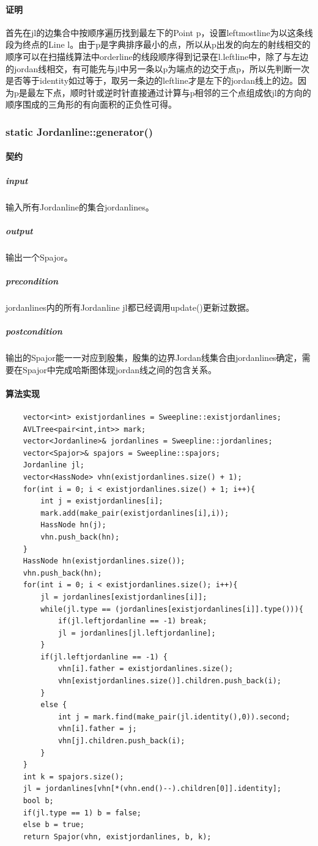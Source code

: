 \documentclass[a4paper]{book}
\numberwithin{equation}{chapter}
\theoremstyle{definition}
\begin{document}
\paragraph{证明}
首先在jl的边集合中按顺序遍历找到最左下的Point p，设置leftmostline为以这条线段为终点的Line l。由于p是字典排序最小的点，所以从p出发的向左的射线相交的顺序可以在扫描线算法中orderline的线段顺序得到记录在l.leftline中，除了与左边的jordan线相交，有可能先与jl中另一条以p为端点的边交于点p，所以先判断一次是否等于identity如过等于，取另一条边的leftline才是左下的jordan线上的边。因为p是最左下点，顺时针或逆时针直接通过计算与p相邻的三个点组成依jl的方向的顺序围成的三角形的有向面积的正负性可得。
\subsubsection{static Jordanline::generator()}
\paragraph{契约}
\subparagraph{input}
输入所有Jordanline的集合jordanlines。
\subparagraph{output}
输出一个Spajor。
\subparagraph{precondition}
jordanlines内的所有Jordanline jl都已经调用update()更新过数据。
\subparagraph{postcondition}
输出的Spajor能一一对应到殷集，殷集的边界Jordan线集合由jordanlines确定，需要在Spajor中完成哈斯图体现jordan线之间的包含关系。
\paragraph{算法实现}
\begin{lstlisting}
	vector<int> existjordanlines = Sweepline::existjordanlines;
	AVLTree<pair<int,int>> mark;
	vector<Jordanline>& jordanlines = Sweepline::jordanlines; 
	vector<Spajor>& spajors = Sweepline::spajors;
	Jordanline jl;
	vector<HassNode> vhn(existjordanlines.size() + 1);
	for(int i = 0; i < existjordanlines.size() + 1; i++){
		int j = existjordanlines[i];
		mark.add(make_pair(existjordanlines[i],i));
		HassNode hn(j);
		vhn.push_back(hn);
	}
	HassNode hn(existjordanlines.size());
	vhn.push_back(hn);
	for(int i = 0; i < existjordanlines.size(); i++){
		jl = jordanlines[existjordanlines[i]];
		while(jl.type == (jordanlines[existjordanlines[i]].type())){
			if(jl.leftjordanline == -1) break;
			jl = jordanlines[jl.leftjordanline];
		}
		if(jl.leftjordanline == -1) { 
			vhn[i].father = existjordanlines.size();
			vhn[existjordanlines.size()].children.push_back(i);
		}
		else { 
			int j = mark.find(make_pair(jl.identity(),0)).second;
			vhn[i].father = j;
			vhn[j].children.push_back(i);
		}
	}
	int k = spajors.size();
	jl = jordanlines[vhn[*(vhn.end()--).children[0]].identity];
	bool b;
	if(jl.type == 1) b = false;
	else b = true;
	return Spajor(vhn, existjordanlines, b, k);
\end{lstlisting}
\end{document}
